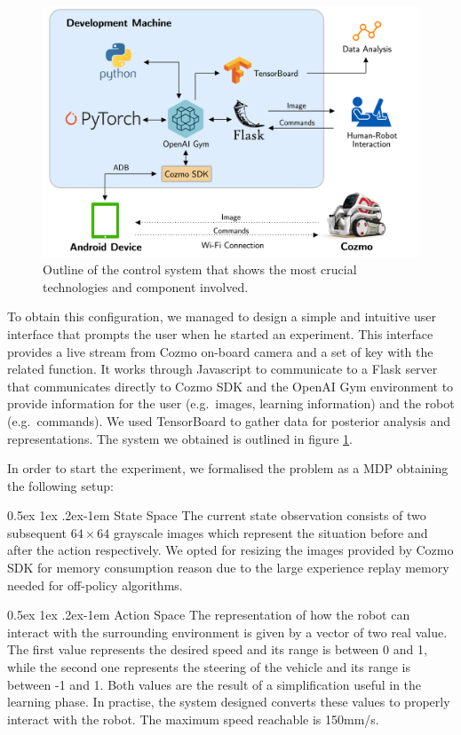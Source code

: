 \documentclass[10pt,twocolumn,letterpaper]{article}
\makeatletter
\renewcommand{\paragraph}{%
  \@startsection{paragraph}{4}%
  {\z@}{0.5ex \@plus 1ex \@minus .2ex}{-1em}%
  {\normalfont\normalsize\bfseries}%
}
\makeatother
\begin{document}
\begin{figure}[tbp]
    \centering
    \includegraphics[width=0.97\columnwidth]{cozmo-system.png}
    \caption[Outline of the control system]{Outline of the control system that shows the most crucial technologies and component involved.}
    \label{system}
\end{figure}

To obtain this configuration, we managed to design a simple and intuitive user interface that prompts the user when he started an experiment. This interface provides a live stream from Cozmo on-board camera and a set of key with the related function. It works through Javascript to communicate to a Flask server that communicates directly to Cozmo SDK and the OpenAI Gym environment to provide information for the user (e.g.\ images, learning information) and the robot (e.g.\ commands). We used TensorBoard to gather data for posterior analysis and representations. The system we obtained is outlined in figure \ref{system}.

In order to start the experiment, we formalised the problem as a MDP obtaining the following setup:

\paragraph{State Space} The current state observation consists of two subsequent $64 \times 64$ grayscale images which represent the situation before and after the action respectively. We opted for resizing the images provided by Cozmo SDK for memory consumption reason due to the large experience replay memory needed for off-policy  algorithms.

\paragraph{Action Space} The representation of how the robot can interact with the surrounding environment is given by a vector of two real value. The first value represents the desired speed and its range is between 0 and 1, while the second one represents the steering of the vehicle and its range is between -1 and 1. Both values are the result of a simplification useful in the learning phase. In practise, the system designed converts these values to properly interact with the robot. The maximum speed reachable is 150mm/s.
\end{document}
